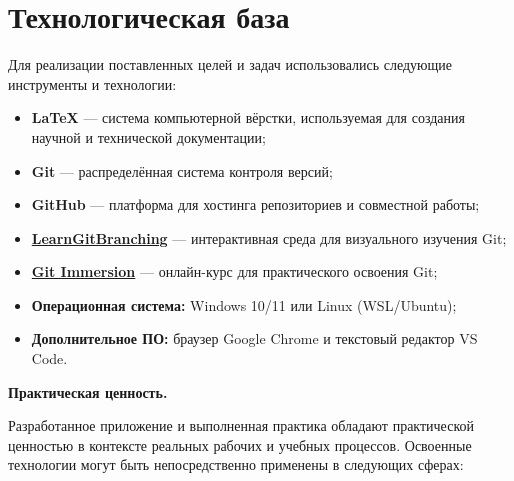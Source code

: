 \documentclass[a4paper,12pt]{report}
\begin{document}
\section*{Технологическая база}

Для реализации поставленных целей и задач использовались следующие инструменты и технологии:

\begin{itemize}
    \item \textbf{LaTeX} --- система компьютерной вёрстки, используемая для создания научной и технической документации;
    \item \textbf{Git} --- распределённая система контроля версий;
    \item \textbf{GitHub} --- платформа для хостинга репозиториев и совместной работы;
    \item \href{https://learngitbranching.js.org/}{\textbf{LearnGitBranching}} --- интерактивная среда для визуального изучения Git;
    \item \href{https://gitimmersion.com/index.html}{\textbf{Git Immersion}} --- онлайн-курс для практического освоения Git;
    \item \textbf{Операционная система:} Windows 10/11 или Linux (WSL/Ubuntu);
    \item \textbf{Дополнительное ПО:} браузер Google Chrome и текстовый редактор VS Code.
\end{itemize}

\textbf{Практическая ценность.}

Разработанное приложение и выполненная практика обладают практической ценностью в контексте реальных рабочих и учебных процессов. Освоенные технологии могут быть непосредственно применены в следующих сферах:
\end{document}
